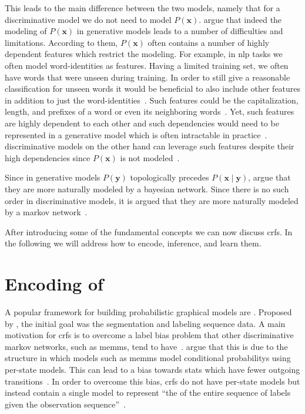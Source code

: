 This leads to the main difference between the two models, namely that for a \gls{discriminative model} we do not need to model $P(\mathbf{x})$.
\citet{sutton2010introduction} argue that indeed the modeling of $P(\mathbf{x})$ in \glspl{generative model} leads to a number of difficulties and limitations.
According to them, $P(\mathbf{x})$ often contains a number of highly dependent features which restrict the modeling.
For example, in \gls{nlp} tasks we often model word-identities as features.
Having a limited training set, we often have words that were unseen during training.
In order to still give a reasonable classification for unseen words it would be beneficial to also include other features in addition to just the word-identities~\citep{sutton2010introduction}.
Such features could be the capitalization, length, and prefixes of a word or even its neighboring words~\citep{sutton2010introduction}.
Yet, such features are highly dependent to each other and such dependencies would need to be represented in a \gls{generative model} which is often intractable in practice~\citep{sutton2010introduction}.
\Glspl{discriminative model} on the other hand can leverage such features despite their high dependencies since $P(\mathbf{x})$ is not modeled~\citep{koller2009probabilistic}.

Since in \glspl{generative model} $P(\mathbf{y})$ topologically precedes $P(\mathbf{x}\mid\mathbf{y})$, \citet{sutton2010introduction} argue that they are more naturally modeled by a \gls{bayesian network}.
Since there is no such order in \glspl{discriminative model}, it is argued that they are more naturally modeled by a \gls{markov network}~\citep{sutton2010introduction}.

\bigskip

After introducing some of the fundamental concepts we can now discuss \glspl{crf}. In the following we will address how to encode, inference, and learn them.

\section{Encoding of }\label{sec:definition-crfs}
A popular framework for building \glspl{probabilistic graphical model} are .
Proposed by \citet{lafferty2001conditional}, the initial goal was the segmentation and labeling sequence data.
A main motivation for \glspl{crf} is to overcome a label bias problem that other discriminative \glspl{markov network}, such as \glspl{memm}, tend to have~\citep{lafferty2001conditional}.
\citet{lafferty2001conditional} argue that this is due to the structure in which models such as \glspl{memm} model \glspl{conditional probability} using per-state models.
This can lead to a bias towards stats which have fewer outgoing transitions~\citep{lafferty2001conditional}.
In order to overcome this bias, \glspl{crf} do not have per-state models but instead contain a single model to represent ``the  of the entire sequence of labels given the observation sequence''~\citep{lafferty2001conditional}.

